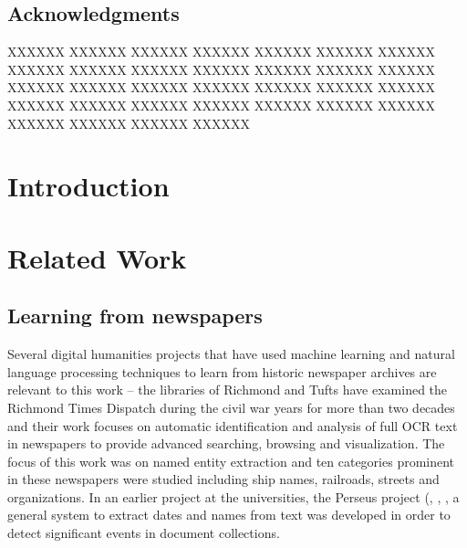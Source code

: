 \documentclass[letterpaper,11pt]{report}
\begin{document}
\newpage
\pagestyle{empty}


\newpage



\section*{Acknowledgments}\label{section:acknowledgments}
\pagestyle{plain}

XXXXXX XXXXXX XXXXXX XXXXXX XXXXXX XXXXXX XXXXXX XXXXXX XXXXXX XXXXXX XXXXXX XXXXXX XXXXXX XXXXXX XXXXXX XXXXXX XXXXXX XXXXXX XXXXXX XXXXXX XXXXXX XXXXXX XXXXXX XXXXXX XXXXXX XXXXXX XXXXXX XXXXXX XXXXXX XXXXXX XXXXXX XXXXXX 

\newpage

\tableofcontents
\listoffigures 
\listoftables

\newpage

\newpage

\newpage
\mbox{}



\chapter{Introduction}\label{chapter:introduction}
\setcounter{page}{1}
\onehalfspacing
 

\chapter{Related Work}


\section{Learning from newspapers}
Several digital humanities projects that have used machine learning and natural language processing techniques to learn from historic newspaper archives are relevant to this work – the libraries of Richmond and Tufts have examined the Richmond Times Dispatch during the civil war years for more than two decades and their work focuses on automatic identification and analysis of full OCR text in newspapers to provide advanced searching, browsing and visualization\cite{crane2006challenge}. The focus of this work was on named entity extraction and ten categories prominent in these newspapers were studied including ship names, railroads, streets and organizations. In an earlier project at the universities, the Perseus project (\cite{ smith2002detectinga}, \cite{smith2002detectingb}, \cite{smith2001disambiguating}, a general system to extract dates and names from text was developed in order to detect significant events in document collections. 
\end{document}
